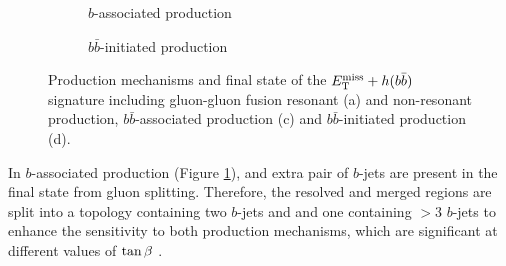 \begin{figure}
\begin{subfigure}[b]{0.48\textwidth}
        \caption{$b$-associated production}
        \label{subfig:hbb-bb-associated}
    \end{subfigure}
    \begin{subfigure}[b]{0.48\textwidth}
        \centering
        \vspace{1.0cm}
        \caption{$b\bar{b}$-initiated production}
        \label{subfig:hbb-bb-initiated}
    \end{subfigure}
    \caption{Production mechanisms and final state of the $E_{\mathrm{T}}^{\mathrm{miss}}+h(b\bar{b})$ signature including gluon-gluon fusion resonant (a) and non-resonant production, $b\bar{b}$-associated production (c) and $b\bar{b}$-initiated production (d).}
    \label{fig:hbb-signature}
\end{figure} 

In $b$-associated production (Figure \ref{subfig:hbb-bb-associated}), and extra pair of $b$-jets are present in the final state from gluon splitting. Therefore, the resolved and merged regions are split into a topology containing two $b$-jets and and one containing $>3$ $b$-jets to enhance the sensitivity to both production mechanisms, which are significant at different values of $\tan\beta~$.

